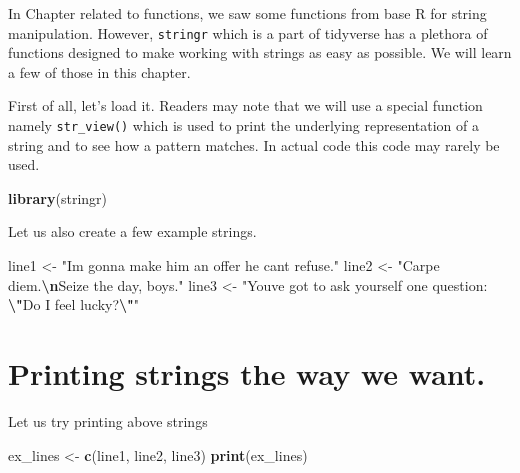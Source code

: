 \documentclass[
]{book}
\newenvironment{Shaded}{\begin{snugshade}}{\end{snugshade}}
\newcommand{\FunctionTok}[1]{\textcolor[rgb]{0.13,0.29,0.53}{\textbf{#1}}}
\newcommand{\NormalTok}[1]{#1}
\newcommand{\OtherTok}[1]{\textcolor[rgb]{0.56,0.35,0.01}{#1}}
\newcommand{\SpecialCharTok}[1]{\textcolor[rgb]{0.81,0.36,0.00}{\textbf{#1}}}
\newcommand{\StringTok}[1]{\textcolor[rgb]{0.31,0.60,0.02}{#1}}
\begin{document}
In Chapter related to functions, we saw some functions from base R for string manipulation. However, \texttt{stringr} which is a part of tidyverse has a plethora of functions designed to make working with strings as easy as possible. We will learn a few of those in this chapter.

First of all, let's load it. Readers may note that we will use a special function namely \texttt{str\_view()} which is used to print the underlying representation of a string and to see how a pattern matches. In actual code this code may rarely be used.

\begin{Shaded}
\begin{Highlighting}[]
\FunctionTok{library}\NormalTok{(stringr)}
\end{Highlighting}
\end{Shaded}

Let us also create a few example strings.

\begin{Shaded}
\begin{Highlighting}[]
\NormalTok{line1 }\OtherTok{\textless{}{-}} \StringTok{"I\textquotesingle{}m gonna make him an offer he can\textquotesingle{}t refuse."}
\NormalTok{line2 }\OtherTok{\textless{}{-}} \StringTok{"Carpe diem.}\SpecialCharTok{\textbackslash{}n}\StringTok{Seize the day, boys."}
\NormalTok{line3 }\OtherTok{\textless{}{-}} \StringTok{"You\textquotesingle{}ve got to ask yourself one question: }\SpecialCharTok{\textbackslash{}"}\StringTok{Do I feel lucky?}\SpecialCharTok{\textbackslash{}"}\StringTok{"}
\end{Highlighting}
\end{Shaded}

\hypertarget{printing-strings-the-way-we-want.}{%
\section{Printing strings the way we want.}\label{printing-strings-the-way-we-want.}}

Let us try printing above strings

\begin{Shaded}
\begin{Highlighting}[]
\NormalTok{ex\_lines }\OtherTok{\textless{}{-}} \FunctionTok{c}\NormalTok{(line1, line2, line3)}
\FunctionTok{print}\NormalTok{(ex\_lines)}
\end{Highlighting}
\end{Shaded}
\end{document}

